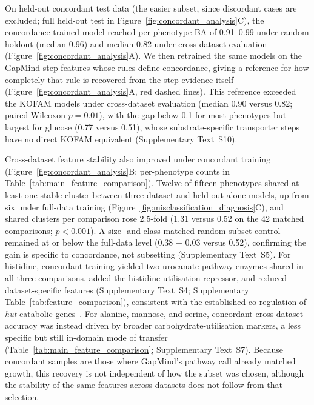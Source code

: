 On held-out concordant test data (the easier subset, since discordant cases are excluded; full held-out test in Figure~\ref{fig:concordant_analysis}C), the concordance-trained model reached per-phenotype BA of 0.91--0.99 under random holdout (median 0.96) and median 0.82 under cross-dataset evaluation (Figure~\ref{fig:concordant_analysis}A).
We then retrained the same models on the GapMind step features whose rules define concordance, giving a reference for how completely that rule is recovered from the step evidence itself (Figure~\ref{fig:concordant_analysis}A, red dashed lines).
This reference exceeded the KOFAM models under cross-dataset evaluation (median 0.90 versus 0.82; paired Wilcoxon $p = 0.01$), with the gap below 0.1 for most phenotypes but largest for glucose (0.77 versus 0.51), whose substrate-specific transporter steps have no direct KOFAM equivalent (Supplementary Text~S10).

Cross-dataset feature stability also improved under concordant training (Figure~\ref{fig:concordant_analysis}B; per-phenotype counts in Table~\ref{tab:main_feature_comparison}). Twelve of fifteen phenotypes shared at least one stable cluster between three-dataset and held-out-alone models, up from six under full-data training (Figure~\ref{fig:misclassification_diagnosis}C), and shared clusters per comparison rose 2.5-fold (1.31 versus 0.52 on the 42 matched comparisons; $p < 0.001$). A size- and class-matched random-subset control remained at or below the full-data level (0.38 $\pm$ 0.03 versus 0.52), confirming the gain is specific to concordance, not subsetting (Supplementary Text~S5).
For histidine, concordant training yielded two urocanate-pathway enzymes shared in all three comparisons, added the histidine-utilisation repressor, and reduced dataset-specific features (Supplementary Text~S4; Supplementary Table~\ref{tab:feature_comparison}), consistent with the established co-regulation of \emph{hut} catabolic genes~\cite{Bender2012HutBacteria}.
For alanine, mannose, and serine, concordant cross-dataset accuracy was instead driven by broader carbohydrate-utilisation markers, a less specific but still in-domain mode of transfer (Table~\ref{tab:main_feature_comparison}; Supplementary Text~S7).
Because concordant samples are those where GapMind's pathway call already matched growth, this recovery is not independent of how the subset was chosen, although the stability of the same features across datasets does not follow from that selection.

